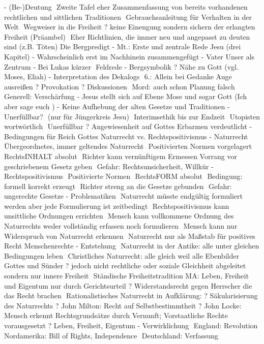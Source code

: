 \documentclass[11pt, paper=a4, twocolumn]{scrartcl}
\begin{document}
-	(Be-)Deutung
	Zweite Tafel eher Zusammenfassung von bereits vorhandenen rechtlichen und sittlichen Traditionen
	Gebrauchsanleitung für Verhalten in der Welt
	Wegweiser in die Freiheit ? keine Einengung sondern sichern der erlangten Freiheit (Präambel)
	Eher Richtlinien, die immer neu und angepasst zu deuten sind (z.B. Töten)
Die Bergpredigt
-	Mt.: Erste und zentrale Rede Jesu (drei Kapitel)
-	Wahrscheinlich erst im Nachhinein zusammengefügt
-	Vater Unser als Zentrum
-	Bei Lukas kürzer  Feldrede
-	Bergsymbolik ? Nähe zu Gott (vgl. Moses, Eliah)
-	Interpretation des Dekalogs
	6.: Allein bei Gedanke Auge ausreißen
? Provokation ? Diskussionen
	Mord: auch schon Planung falsch
	Generell: Verschärfung
-	Jesus stellt sich auf Ebene Mose und sogar Gott (Ich aber sage euch )
-	Keine Aufhebung der alten Gesetze und Traditionen
-	Unerfüllbar?
	(nur für Jüngerkreis Jesu)
	Interimsethik bis zur Endzeit
	Utopisten wortwörtlich
	Unerfüllbar ? Angewiesenheit auf Gottes Erbarmen verdeutlicht
-	Bedingungen für Reich Gottes
Naturrecht vs. Rechtspositivismus
-	Naturrecht
	Übergeordnetes, immer geltendes Naturrecht
	Positivierten Normen vorgelagert
	RechtsINHALT absolut
	Richter kann vernünftigem Ermessen Vorrang vor geschriebenem Gesetz geben
	Gefahr: Rechtsunsicherheit, Willkür
-	Rechtspositivismus
	Positivierte Normen
	RechtsFORM absolut
	Bedingung: formell korrekt erzeugt
	Richter streng an die Gesetze gebunden
	Gefahr: ungerechte Gesetze
-	Problematiken
	Naturrecht müsste endgültig formuliert werden aber jede Formulierung ist zeitbedingt
	Rechtspositivismus kann unsittliche Ordnungen errichten
	Mensch kann vollkommene Ordnung des Naturrechts weder vollständig erfassen noch formulieren
	Mensch kann nur Widerspruch von Naturrecht erkennen
	Naturrecht nur als Maßstab für positives Recht
Menschenrechte
-	Entstehung
	Naturrecht in der Antike: alle unter gleichen Bedingungen leben
	Christliches Naturrecht: alle gleich weil alle Ebenbilder Gottes und Sünder ? jedoch nicht rechtliche oder soziale Gleichheit abgeleitet sondern nur  innere Freiheit
	Ständische Freiheitstradition MA:
Leben, Freiheit und Eigentum nur durch Gerichtsurteil ? Widerstandsrecht gegen Herrscher die das Recht brachen
	Rationalistisches Naturrecht in Aufklärung:
?	Säkularisierung des Naturrechts
?	John Milton: Recht auf Selbstbestimmtheit
?	John Locke: Mensch erkennt Rechtsgrundsätze durch Vernunft; Vorstaatliche Rechte vorausgesetzt
? Leben, Freiheit, Eigentum
-	Verwirklichung
	England: Revolution
	Nordamerika: Bill of Rights, Independence
	Deutschland: Verfassung
\end{document}
